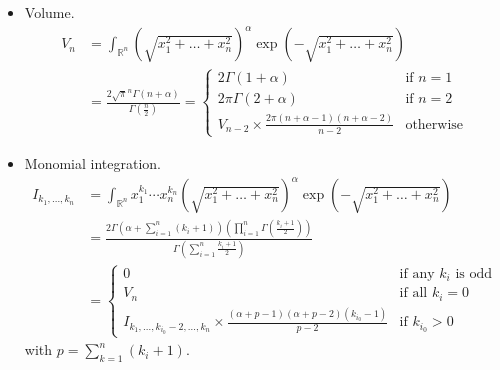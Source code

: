 \documentclass[draft]{scrartcl}
\begin{document}
\begin{itemize}
  \item Volume.
\begin{equation*}\label{ndimlaguerre}
  \begin{split}
  V_n
    &= \int_{\mathbb{R}^n} \left(\sqrt{x_1^2+\dots+x_n^2}\right)^\alpha \exp\left(-\sqrt{x_1^2+\dots+x_n^2}\right)\\
    &= \frac{2 \sqrt{\pi}^n \Gamma(n+\alpha)}{\Gamma(\frac{n}{2})}
  = \begin{cases}
    2\Gamma(1+\alpha)&\text{if $n=1$}\\
    2\pi\Gamma(2 + \alpha)&\text{if $n=2$}\\
    V_{n-2} \times \frac{2\pi(n+\alpha-1) (n+\alpha-2)}{n-2}&\text{otherwise}
  \end{cases}
  \end{split}
\end{equation*}

\item Monomial integration.
\[
  \begin{split}
  I_{k_1,\dots,k_n}
  &= \int_{\mathbb{R}^n} x_1^{k_1}\cdots x_n^{k_n}
    \left(\sqrt{x_1^2+\dots+x_n^2}\right)^\alpha \exp\left(-\sqrt{x_1^2+\dots+x_n^2}\right)\\
  &= \frac{
    2 \Gamma\left(\alpha + \sum_{i=1}^n (k_i+1)\right)
    \left(\prod_{i=1}^n\Gamma\left(\frac{k_i + 1}{2}\right)\right)
  }{
    \Gamma\left(\sum_{i=1}^n\frac{k_i + 1}{2}\right)
  }\\
  &=\begin{cases}
    0&\text{if any $k_i$ is odd}\\
    V_n&\text{if all $k_i=0$}\\
    I_{k_1,\dots,k_{i_0}-2,\dots,k_n} \times \frac{
      (\alpha + p - 1) (\alpha + p - 2) (k_{i_0} - 1)
    }{
        p - 2
    }&\text{if $k_{i_0} > 0$}
  \end{cases}
  \end{split}
\]
with $p=\sum_{k=1}^n (k_i + 1)$.
\end{itemize}
\end{document}
